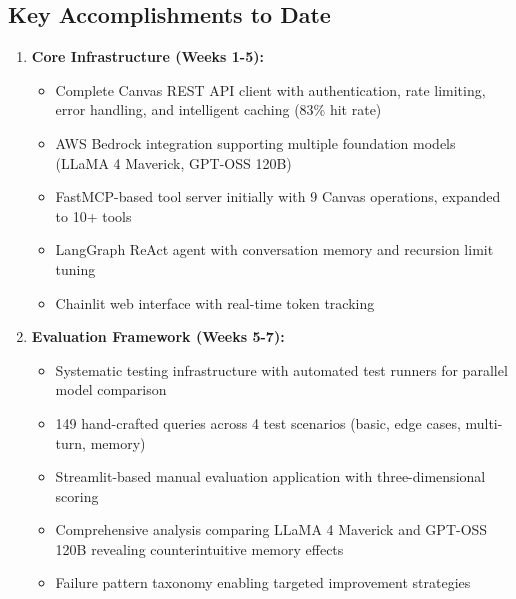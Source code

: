 \documentclass{article}
\begin{document}
\subsection{Key Accomplishments to Date}

\begin{enumerate}
    \item \textbf{Core Infrastructure (Weeks 1-5):}
    \begin{itemize}
        \item Complete Canvas REST API client with authentication, rate limiting, error handling, and intelligent caching (83\% hit rate)
        \item AWS Bedrock integration supporting multiple foundation models (LLaMA 4 Maverick, GPT-OSS 120B)
        \item FastMCP-based tool server initially with 9 Canvas operations, expanded to 10+ tools
        \item LangGraph ReAct agent with conversation memory and recursion limit tuning
        \item Chainlit web interface with real-time token tracking
    \end{itemize}
    
    \item \textbf{Evaluation Framework (Weeks 5-7):}
    \begin{itemize}
        \item Systematic testing infrastructure with automated test runners for parallel model comparison
        \item 149 hand-crafted queries across 4 test scenarios (basic, edge cases, multi-turn, memory)
        \item Streamlit-based manual evaluation application with three-dimensional scoring
        \item Comprehensive analysis comparing LLaMA 4 Maverick and GPT-OSS 120B revealing counterintuitive memory effects
        \item Failure pattern taxonomy enabling targeted improvement strategies
    \end{itemize}
    

\end{enumerate}
\end{document}
